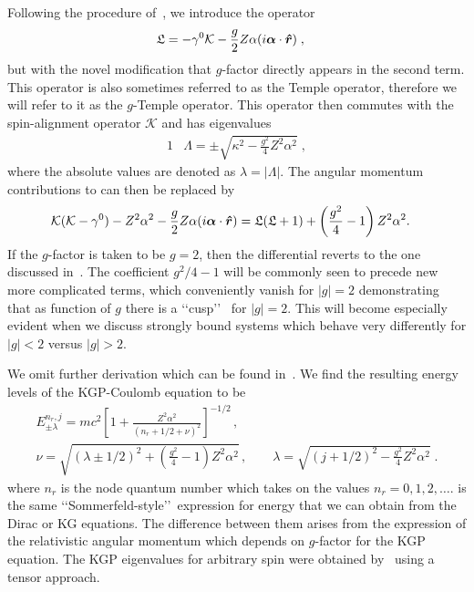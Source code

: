 Following the procedure of~\cite{Martin:1958zz}, we introduce the operator
\begin{alignat}{1}
\label{cou07} &\mathfrak{L}=-\gamma^{0}\mathcal{K}-\frac{g}{2}Z\alpha(i\boldsymbol{\alpha}\cdot\boldsymbol{\hat{r}})\;,
\end{alignat}
but with the novel modification that $g$-factor directly appears in the second term. This operator is also sometimes referred to as the Temple operator, therefore we will refer to it as the $g$-Temple operator. This operator then commutes with the spin-alignment operator $\mathcal{K}$ and has eigenvalues
\begin{alignat}{1}
\label{cou08} &\Lambda=\pm\sqrt{\kappa^{2}-\displaystyle\frac{\displaystyle g^{2}}{4}Z^{2}\alpha^{2}}\;,\end{alignat}
where the absolute values are denoted as $\lambda=|\Lambda|$. The angular momentum contributions to  can then be replaced by
\begin{alignat}{1}
\label{cou09} &\mathcal{K}(\mathcal{K}-\gamma^{0})-Z^{2}\alpha^{2}-\frac{g}{2}Z\alpha(i\boldsymbol{\alpha}\cdot\boldsymbol{\hat{r}})=\mathfrak{L}(\mathfrak{L}+1)+\left(\frac{g^{2}}{4}-1\right)Z^{2}\alpha^{2}.
\end{alignat}
If the $g$-factor is taken to be $g\!=\!2$, then the differential  reverts to the one discussed in~\cite{Martin:1958zz}. The coefficient $g^{2}/4-1$ will be commonly seen to precede new more complicated terms, which conveniently vanish for $|g|=2$ demonstrating that as function of $g$ there is a \lq\lq cusp\rq\rq~\citep{Rafelski:2022bsv} for $|g|=2$. This will become especially evident when we discuss strongly bound systems which behave very differently for $|g|<2$ versus $|g|>2$. 

We omit further derivation which can be found in~\cite{Steinmetz:2018ryf}. We find the resulting energy levels of the KGP-Coulomb equation to be 
\begin{gather}
\label{cou17} E_{\pm\lambda}^{n_{r},j}=mc^{2}\left[1+\displaystyle\frac{Z^{2}\alpha^{2}}{\left(n_{r}+1/2+\nu\right)^{2}}\right]^{-1/2}\,,\\
\label{cou17b} \nu=\sqrt{(\lambda\pm1/2)^{2}+\left(\frac{g^{2}}{4}-1\right)Z^{2}\alpha^{2}}\,,\qquad
\lambda=\sqrt{\displaystyle(j+1/2)^{2}-\frac{\displaystyle g^{2}}{4}Z^{2}\alpha^{2}}\;.
\end{gather}
where $n_{r}$ is the node quantum number which takes on the values $n_{r}=0,1,2,\ldots$.  is the same \lq\lq Sommerfeld-style\rq\rq\ expression for energy that we can obtain from the Dirac or KG equations. The difference between them arises from the expression of the relativistic angular momentum which depends on $g$-factor for the KGP equation. The KGP eigenvalues  for arbitrary spin were obtained by~\cite{Niederle:2004bx} using a tensor approach.

